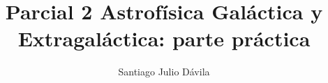 \documentclass[final,5p,times,twocolumn, nopreprintline]{elsarticle}
\numberwithin{equation}{section}
\begin{document}
\begin{frontmatter}



\title{Parcial 2 Astrofísica Galáctica y Extragaláctica: parte práctica}


\author[first]{Santiago Julio Dávila}


%



%
%


\end{frontmatter}
\end{document}
